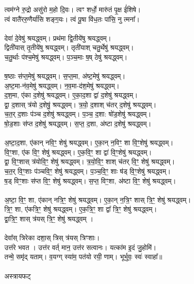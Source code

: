 \subsubsection{}
त्वम॑ग्ने रु॒द्रो असु॑रो म॒हो दि॒वः। त्वꣳ शर्धो॒ मारु॑तं पृ॒क्ष ई॑शिषे।\\
त्वं वातै॑ररु॒णैर्या॑सि शङ्ग॒यः। त्वं पू॒षा वि॑ध॒तः पा॑सि॒ नु त्मना᳚।\\
\\
देवा॑ दे॒वेषु॑ श्रयद्ध्वम्। प्रथ॑मा द्वि॒तीये॑षु श्रयद्ध्वम्। \\
द्विती॑यास् तृ॒तीये॑षु श्रयद्ध्वम्। तृती॑याश् चतु॒र्थेषु॑ श्रयद्ध्वम्। \\
च॒तु॒र्थाः प॑श्च॒मेषु॑ श्रयद्ध्वम्। प॒ञ्च॒माः ष॒ष् ठेषु॑ श्रयद्ध्वम्।\\
\\
ष॒ष्ठाः स॑प्त॒मेषु॑ श्रयद्ध्वम्। स॒प्त॒मा, अ॑ष्ट॒मेषु॑ श्रयद्ध्वम्। \\
अ॒ष्ट॒मा-न॑व॒मेषु॑ श्रयद्ध्वम्। न॒व॒मा-द॑श॒मेषु॑ श्रयद्ध्वम्। \\
द॒श॒मा, ए॑का द॒शेषु॑ श्रयद्ध्वम्। ए॒का॒द॒शा द्वा॑ द॒शेषु॑ श्रयद्ध्वम्। \\
द्वा॒ द॒शास् त्र॑यो द॒शेषु॒॑ श्रयद्ध्वम्। त्र॒यो॒ द॒शाश् च॑तर् द॒शेषु॑ श्रयद्ध्वम्। \\
च॒त॒र् द॒शाः प॑ञ्च द॒शेषु॑ श्रयद्ध्वम्। प॒ञ्च॒ द॒शा: षो॑ड॒शेषु॑ श्रयद्ध्वम्। \\
षो॒ड॒शाः स॑प्त द॒शेषु॑ श्रयद्ध्वम्। स॒प्त॒ द॒शा, अ॑ष्टा द॒शेषु॑ श्रयद्ध्वम्।\\
\\
अ॒ष्टा॒द॒शा, ए॑कान् नवि॒ꣳ॒ शेषु॑ श्रयद्ध्वम्। ए॒का॒न् न॒विꣳ॒ शा वि॒ꣳ॒शेषु॑ श्रयद्ध्वम्। \\
वि॒ꣳ॒शा, ए॑क वि॒ꣳ॒ शेषु॑ श्रयद्ध्वम्। ए॒क॒वि॒ꣳ॒ शा द्वा॑ वि॒ꣳ॒शेषु॑ श्रयद्ध्वम्। \\
द्वा॒ वि॒ꣳ॒शास् त्र॑योवि॒ꣳ॒ शेषु॑ श्रयद्ध्वम्। त्र॒यो॒वि॒ꣳ॒ शाश् च॑तर् वि॒ꣳ॒ शेषु॑ श्रयद्ध्वम्। \\
च॒त॒र् वि॒ꣳ॒शाः प॑ञ्चवि॒ꣳ॒ शेषु॑ श्रयद्ध्वम्। प॒ञ्च॒वि॒ꣳ॒ शाः ष॑ड् वि॒ꣳ॒शेषु॑ श्रयद्ध्वम्। \\
ष॒ड् विꣳ॒शाः स॑प्त वि॒ꣳ॒ शेषु॑ श्रयद्ध्वम्। स॒प्त॒ विꣳ॒शा, अ॑ष्टा वि॒ꣳ॒ शेषु॑ श्रयद्ध्वम्। \\
\\
अ॒ष्टा॒ वि॒ꣳ॒ शा, ए॑कान् नत्रि॒ꣳ॒ शेषु॑ श्रयद्ध्वम्। ए॒का॒न् न॒त्रि॒ꣳ शास् त्रि॒ꣳ॒ शेषु॑ श्रयद्ध्वम्। \\
त्रि॒ꣳ॒ शा, ए॑कत्रि॒ꣳ॒ शेषु॑ श्रयद्ध्वम्। ए॒क॒त्रि॒ꣳ॒ शा द्वा᳚ त्रि॒ꣳ॒ शेषु॑ श्रयद्ध्वम्।\\
द्वा॒त्रि॒ꣳ॒ शास् त्र॑यस् त्रि॒ꣳ॒ शेषु॑ श्रयद्ध्वम् । \\
\\
देवा᳚स् त्रिरेका दशा॒स् त्रिस् त्र॑यस् त्रिꣳशाः। \\
उत्त॑रे भवत । उत्त॑र वर्त् मान॒ उत्त॑र सत्वानः। यत्का॑म इ॒दं जु॒होमि॑।\\
तन्मे॒ समृ॑द् यताम्। व॒यग्ग् स्या॑म॒ पत॑यो रयी॒ णाम्। भूर्भुवः॒ स्वः॑ स्वाहा᳚॥\\
\\
अस्त्रायफट्\\
